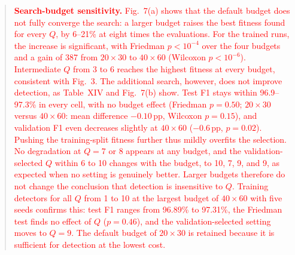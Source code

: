 \documentclass[11pt]{article}
\newenvironment{excerpt}{\begin{quote}\sloppy}{\end{quote}}
\begin{document}
\begin{excerpt}
\begin{figure}[H]
\end{figure}

\textcolor{red}{\textbf{Search-budget sensitivity.}
Fig.~7(a) shows that the default budget does not fully
converge the search: a larger budget raises the best fitness found for
every $Q$, by 6--21\% at eight times the evaluations. For the trained
runs, the increase is significant, with Friedman $p<10^{-4}$ over the
four budgets and a gain of 387 from $20\times30$ to $40\times60$
(Wilcoxon $p<10^{-6}$). Intermediate $Q$ from 3 to 6 reaches the
highest fitness at every budget, consistent with
Fig.~3. The additional search, however, does not
improve detection, as Table~XIV and
Fig.~7(b) show. Test F1 stays within 96.9--97.3\% in every
cell, with no budget effect (Friedman $p=0.50$; $20\times30$ versus
$40\times60$: mean difference $-0.10$\,pp, Wilcoxon $p=0.15$), and
validation F1 even decreases slightly at $40\times60$ ($-0.6$\,pp,
$p=0.02$). Pushing the training-split fitness further thus mildly
overfits the selection. No degradation at $Q=7$ or 8 appears at any
budget, and the validation-selected $Q$ within 6 to 10 changes with
the budget, to 10, 7, 9, and 9, as expected when no setting is
genuinely better. Larger budgets therefore do not change the conclusion that detection is insensitive to $Q$.
Training detectors for all $Q$ from 1 to 10 at the largest budget of
$40\times60$ with five seeds confirms this: test F1 ranges from
96.89\% to 97.31\%, the Friedman test finds no effect of $Q$
($p=0.46$), and the validation-selected setting moves to $Q=9$. The
default budget of $20\times30$ is retained because it is sufficient
for detection at the lowest cost.}
\end{excerpt}
\setcounter{table}{13}
\end{document}
